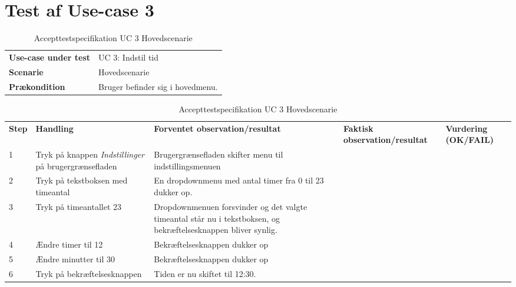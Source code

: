 \section{Test af Use-case 3}
\begin{table}[H]
	\centering
	\caption{Accepttestspecifikation UC 3 Hovedscenarie}
	\label{ATUC1:Hovedscenarie}
	\begin{tabular}{ p{80pt}  p{320pt} }\hline
		\rowcolor{white}	
		\textbf{Use-case under test} & UC 3: Indstil tid \\
		\rowcolor{lightgray}
		\textbf{Scenarie} & Hovedscenarie \\\rowcolor{white}	
		\textbf{Prækondition} & Bruger befinder sig i hovedmenu.
 \\
		\hline
	\end{tabular}
	\begin{tabular}{  p{26pt} p{100pt}  p{101pt} | p{67pt} | p{68pt}}
		\textbf{Step} & \textbf{Handling} & \textbf{Forventet observation/resultat} & \textbf{Faktisk observation/resultat} & \textbf{Vurdering (OK/FAIL)}\\
		1 & Tryk på knappen \emph{Indstillinger} på brugergrænsefladen & Brugergrænsefladen skifter menu til indstillingsmenuen &  &  \\
		2 & Tryk på tekstboksen med timeantal & En dropdownmenu med antal timer fra 0 til 23 dukker op.  &  & \\
		3 & Tryk på timeantallet 23 & Dropdownmenuen forsvinder og det valgte timeantal står nu i tekstboksen, og bekræftelsesknappen bliver synlig. &  &  \\
		
		4 & Ændre timer til 12 & Bekræftelsesknappen dukker op &  &  \\
		5 & Ændre minutter til 30 & Bekræftelsesknappen dukker op &  &  \\	
		6 & Tryk på bekræftelsesknappen & Tiden er nu skiftet til 12:30.  &  &  \\
		\hline
	\end{tabular}
\end{table}

